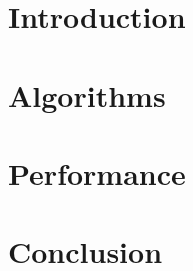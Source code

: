 \documentclass[11pt]{article}
\title{\thetitle}
\author{\theauthor}
\date{}
\begin{document}
\maketitle
\thispagestyle{empty}

\section{Introduction}

\section{Algorithms}

\section{Performance}

\section{Conclusion}
\end{document}
